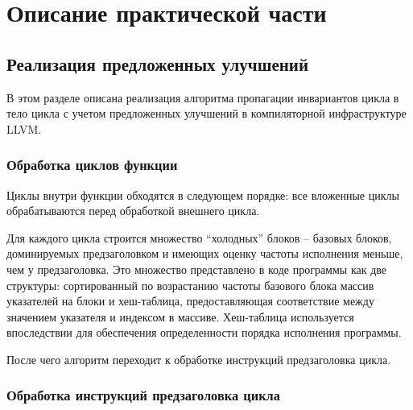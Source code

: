 \chapter{Описание практической части}
\label{sec:Chapter4} 

\section{Реализация предложенных улучшений}

В этом разделе описана реализация алгоритма пропагации инвариантов цикла в тело цикла с учетом предложенных улучшений в компиляторной инфраструктуре LLVM.

\subsection{Обработка циклов функции}

Циклы внутри функции обходятся в следующем порядке: все вложенные циклы обрабатываются перед обработкой внешнего цикла.

Для каждого цикла строится множество \enquote{холодных} блоков -- базовых блоков, доминируемых предзаголовком и имеющих оценку частоты исполнения меньше, чем у предзаголовка.
Это множество представлено в коде программы как две структуры: сортированный по возрастанию частоты базового блока массив указателей на блоки и хеш-таблица, предоставляющая соответствие между значением указателя и индексом в массиве.
Хеш-таблица используется впоследствии для обеспечения определенности порядка исполнения программы.

После чего алгоритм переходит к обработке инструкций предзаголовка цикла.

\subsection{Обработка инструкций предзаголовка цикла}

